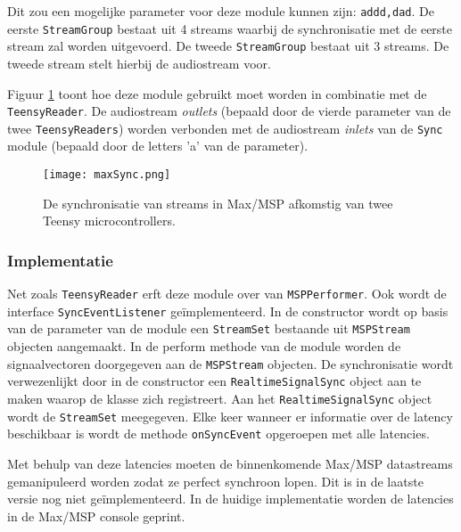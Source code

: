 Dit zou een mogelijke parameter voor deze module kunnen zijn: \texttt{addd,dad}. De eerste \texttt{StreamGroup} bestaat uit 4 streams waarbij de synchronisatie met de eerste stream zal worden uitgevoerd. De tweede \texttt{StreamGroup} bestaat uit 3 streams. De tweede stream stelt hierbij de audiostream voor.

Figuur \ref{maxStreamSync} toont hoe deze module gebruikt moet worden in combinatie met de \texttt{TeensyReader}. De audiostream \textit{outlets} (bepaald door de vierde parameter van de twee \texttt{TeensyReaders}) worden verbonden met de audiostream \textit{inlets} van de \texttt{Sync} module (bepaald door de letters 'a' van de parameter).

\begin{figure}[h!]
	\captionsetup{width=0.8\textwidth}
	\caption[Synchronisatie in Max/MSP]{De synchronisatie van streams in Max/MSP afkomstig van twee Teensy microcontrollers.}
	\begin{center}
		\advance\parskip0.3cm
		\texttt{[image: maxSync.png]}
	\end{center}
	\label{maxStreamSync}
\end{figure}

\subsubsection{Implementatie}

Net zoals \texttt{TeensyReader} erft deze module over van \texttt{MSPPerformer}. Ook wordt de interface \texttt{SyncEventListener} geïmplementeerd. In de constructor wordt op basis van de parameter van de module een \texttt{StreamSet} bestaande uit \texttt{MSPStream} objecten aangemaakt. In de perform methode van de module worden de signaalvectoren doorgegeven aan de \texttt{MSPStream} objecten. De synchronisatie wordt verwezenlijkt door in de constructor een \texttt{RealtimeSignalSync} object aan te maken waarop de klasse zich registreert. Aan het \texttt{RealtimeSignalSync} object wordt de \texttt{StreamSet} meegegeven. Elke keer wanneer er informatie over de latency beschikbaar is wordt de methode \texttt{onSyncEvent} opgeroepen met alle latencies.

Met behulp van deze latencies moeten de binnenkomende Max/MSP datastreams gemanipuleerd worden zodat ze perfect synchroon lopen. Dit is in de laatste versie nog niet geïmplementeerd. In de huidige implementatie worden de latencies in de Max/MSP console geprint.





